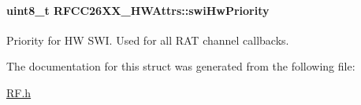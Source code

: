 \paragraph[{swi\+Hw\+Priority}]{\setlength{\rightskip}{0pt plus 5cm}uint8\+\_\+t R\+F\+C\+C26\+X\+X\+\_\+\+H\+W\+Attrs\+::swi\+Hw\+Priority}\label{struct_r_f_c_c26_x_x___h_w_attrs_a48e07869f1eb1619eb2e06cf4a602517}


Priority for H\+W S\+W\+I. Used for all R\+A\+T channel callbacks. 



The documentation for this struct was generated from the following file\+:\begin{DoxyCompactItemize}
\item 
\hyperlink{_r_f_8h}{R\+F.\+h}\end{DoxyCompactItemize}
